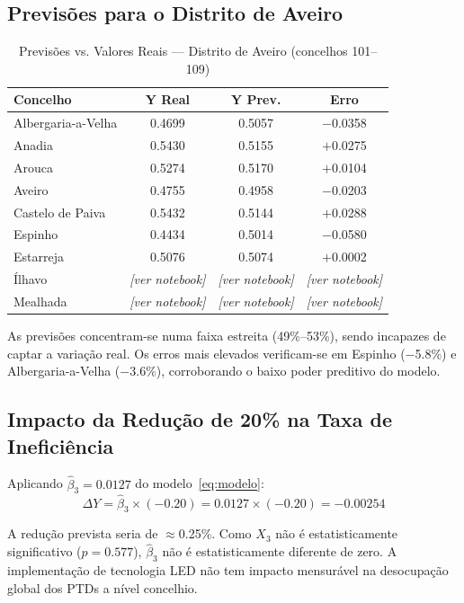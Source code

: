 \documentclass[conference]{IEEEtran}
\begin{document}
\subsection{Previsões para o Distrito de Aveiro}

\begin{table}[htbp]
\caption{Previsões vs. Valores Reais --- Distrito de Aveiro (concelhos 101--109)}
\label{tab:previsoes}
\centering
\begin{tabular}{lccc}
\hline
\textbf{Concelho}  & \textbf{Y Real} & \textbf{Y Prev.} & \textbf{Erro} \\
\hline
Albergaria-a-Velha & 0.4699 & 0.5057 & $-$0.0358 \\
Anadia             & 0.5430 & 0.5155 & $+$0.0275 \\
Arouca             & 0.5274 & 0.5170 & $+$0.0104 \\
Aveiro             & 0.4755 & 0.4958 & $-$0.0203 \\
Castelo de Paiva   & 0.5432 & 0.5144 & $+$0.0288 \\
Espinho            & 0.4434 & 0.5014 & $-$0.0580 \\
Estarreja          & 0.5076 & 0.5074 & $+$0.0002 \\
Ílhavo             & \textit{[ver notebook]} & \textit{[ver notebook]} & \textit{[ver notebook]} \\
Mealhada           & \textit{[ver notebook]} & \textit{[ver notebook]} & \textit{[ver notebook]} \\
\hline
\end{tabular}
\end{table}

As previsões concentram-se numa faixa estreita (49\%--53\%), sendo incapazes de captar a variação real. Os erros mais elevados verificam-se em Espinho ($-$5.8\%) e Albergaria-a-Velha ($-$3.6\%), corroborando o baixo poder preditivo do modelo.

\subsection{Impacto da Redução de 20\% na Taxa de Ineficiência}

Aplicando $\hat{\beta}_3 = 0.0127$ do modelo~\eqref{eq:modelo}:
\[
\Delta Y = \hat{\beta}_3 \times (-0.20) = 0.0127 \times (-0.20) = -0.00254
\]

A redução prevista seria de $\approx$0.25\%. Como $X_3$ não é estatisticamente significativo ($p = 0.577$), $\hat{\beta}_3$ não é estatisticamente diferente de zero. A implementação de tecnologia LED não tem impacto mensurável na desocupação global dos PTDs a nível concelhio.
\end{document}
